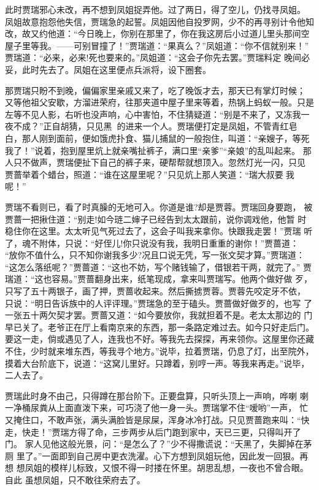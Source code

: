 此时贾瑞邪心未改，再不想到凤姐捉弄他。过了两日，得了空儿，仍找寻凤姐。
凤姐故意抱怨他失信，贾瑞急的起誓。凤姐因他自投罗网，少不的再寻别计令他知
改，故又约他道：“今日晚上，你别在那里了，你在我这房后小过道儿里头那间空
屋子里等我。——可别冒撞了！”贾瑞道：“果真么？”凤姐道：“你不信就别来！”
贾瑞道：“必来，必来!死也要来的。”凤姐道：“这会子你先去罢。”贾瑞料定
晚间必妥，此时先去了。凤姐在这里便点兵派将，设下圈套。

那贾瑞只盼不到晚，偏偏家里亲戚又来了，吃了晚饭才去，那天已有掌灯时候；
又等他祖父安歇，方溜进荣府，往那夹道中屋子里来等着，热锅上蚂蚁一般。只是
左等不见人影，右听也没声响，心中害怕，不住猜疑道：“别是不来了，又冻我一
夜不成？”正自胡猜，只见黑的进来一个人。贾瑞便打定是凤姐，不管青红皂
白，那人刚到面前，便如饿虎扑食、猫儿捕鼠的一般抱住，叫道：“亲嫂子，等死
我了！”说着，抱到屋里炕上就亲嘴扯裤子，满口里“亲爹”“亲娘”的乱叫起来。
那人只不做声，贾瑞便扯下自己的裤子来，硬帮帮就想顶入。忽然灯光一闪，只见
贾蔷举着个蜡台，照道：“谁在这屋里呢？”只见炕上那人笑道：“瑞大叔要我
呢！”

贾瑞不看则已，看了时真臊的无地可入。你道是谁?却是贾蓉。贾瑞回身要跑，
被贾蔷一把揪住道：“别走!如今琏二婶子已经告到太太跟前，说你调戏他，他暂
时稳住你在这里。太太听见气死过去了，这会子叫我来拿你。快跟我走罢！”贾瑞
听了，魂不附体，只说：“好侄儿!你只说没有我，我明日重重的谢你！”贾蔷道：
“放你不值什么，只不知你谢我多少?况且口说无凭，写一张文契才算。”贾瑞道：
“这怎么落纸呢？”贾蔷道：“这也不妨，写个赌钱输了，借银若干两，就完了。”
贾瑞道：“这也容易。”贾蔷翻身出来，纸笔现成，拿来叫贾瑞写。他两个做好做
歹，只写了五十两银子，画了押，贾蔷收起来。然后撕掳贾蓉。贾蓉先咬定牙不依，
只说：“明日告诉族中的人评评理。”贾瑞急的至于磕头。贾蔷做好做歹的，也写
了一张五十两欠契才罢。贾蔷又道：“如今要放你，我就担着不是。老太太那边的
门早已关了。老爷正在厅上看南京来的东西，那一条路定难过去。如今只好走后门。
要这一走，倘或遇见了人，连我也不好。等我先去探探，再来领你。这屋里你还藏
不住，少时就来堆东西，等我寻个地方。”说毕，拉着贾瑞，仍息了灯，出至院外，
摸着大台阶底下，说道：“这窝儿里好。只蹲着，别哼一声。等我来再走。”说毕，
二人去了。

贾瑞此时身不由己，只得蹲在那台阶下。正要盘算，只听头顶上一声响，哗喇
喇一净桶尿粪从上面直泼下来，可巧浇了他一身一头。贾瑞掌不住“嗳哟”一声，
忙又掩住口，不敢声张，满头满脸皆是尿屎，浑身冰冷打战。只见贾蔷跑来叫：“快
走，快走！”贾瑞方得了命，三步两步从后门跑到家中，天已三更，只得叫开了门。
家人见他这般光景，问：“是怎么了？”少不得撒谎说：“天黑了，失脚掉在茅厕
里了。”一面即到自己房中更衣洗濯。心下方想到凤姐玩他，因此发一回狠。再想
想凤姐的模样儿标致，又恨不得一时搂在怀里。胡思乱想，一夜也不曾合眼。自此
虽想凤姐，只不敢往荣府去了。

